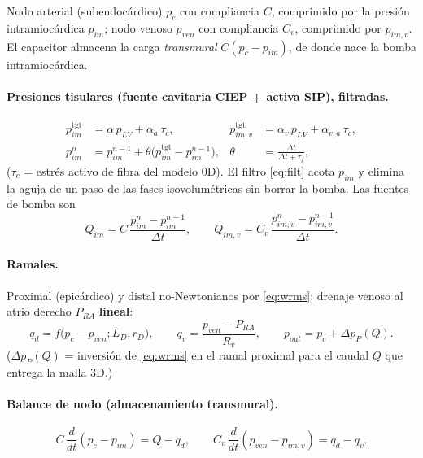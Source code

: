 \documentclass[11pt]{article}
\begin{document}
Nodo arterial (subendocárdico) $p_c$ con compliancia $C$, comprimido por la
presión intramiocárdica $p_{im}$; nodo venoso $p_{ven}$ con compliancia $C_v$,
comprimido por $p_{im,v}$. El capacitor almacena la carga \emph{transmural}
$C(p_c-p_{im})$, de donde nace la bomba intramiocárdica.

\paragraph{Presiones tisulares (fuente cavitaria CIEP + activa SIP), filtradas.}
\begin{align}
  p_{im}^{\text{tgt}}   &= \alpha\,p_{LV}+\alpha_a\,\tau_c, &
  p_{im,v}^{\text{tgt}} &= \alpha_v\,p_{LV}+\alpha_{v,a}\,\tau_c,
  \label{eq:tgt}\\
  p_{im}^{n} &= p_{im}^{n-1}+\theta\bigl(p_{im}^{\text{tgt}}-p_{im}^{n-1}\bigr),
  & \theta &= \frac{\Delta t}{\Delta t+\tau_f},
  \label{eq:filt}
\end{align}
($\tau_c$ = estrés activo de fibra del modelo 0D). El filtro
\eqref{eq:filt} acota $\dot p_{im}$ y elimina la aguja de un paso de las fases
isovolumétricas sin borrar la bomba. Las fuentes de bomba son
\begin{equation}
  Q_{im}=C\,\frac{p_{im}^{n}-p_{im}^{n-1}}{\Delta t},
  \qquad
  Q_{im,v}=C_v\,\frac{p_{im,v}^{n}-p_{im,v}^{n-1}}{\Delta t}.
  \label{eq:pump}
\end{equation}

\paragraph{Ramales.} Proximal (epicárdico) y distal no-Newtonianos por
\eqref{eq:wrms}; drenaje venoso al atrio derecho $P_{RA}$ \textbf{lineal}:
\begin{equation}
  q_d=f\!\bigl(p_c-p_{ven};L_D,r_D\bigr),\qquad
  q_v=\frac{p_{ven}-P_{RA}}{R_v},\qquad
  p_{out}=p_c+\Delta p_P(Q).
  \label{eq:branches}
\end{equation}
($\Delta p_P(Q)$ = inversión de \eqref{eq:wrms} en el ramal proximal para el
caudal $Q$ que entrega la malla 3D.)

\paragraph{Balance de nodo (almacenamiento transmural).}
\begin{equation}
  C\,\frac{d}{dt}(p_c-p_{im})=Q-q_d,
  \qquad
  C_v\,\frac{d}{dt}(p_{ven}-p_{im,v})=q_d-q_v .
  \label{eq:balance}
\end{equation}
\end{document}
